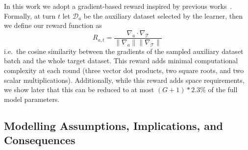 In this work we adopt a gradient-based reward inspired by previous works~\citep{https://doi.org/10.48550/arxiv.1812.02224, NEURIPS2019_0e900ad8, yu2020gradient, wang2021gradient}. Formally, at turn $t$ let $\mathcal{D}_a$ be the auxiliary dataset selected by the learner, then we define our reward function as
\begin{equation}
\label{eq:reward}
R_{a,t} = \frac{\nabla_{a}\cdot\nabla_{\mathcal{T}}}{\|\nabla_{a}\|\|\nabla_{\mathcal{T}}\|}
\end{equation}
i.e.\ the cosine similarity between the gradients of the sampled auxiliary dataset batch and the whole target dataset. This reward adds minimal computational complexity at each round (three vector dot products, two square roots, and two scalar multiplications). Additionally, while this reward adds space requirements,
we show later that this can be reduced to at most $(G+1)*2.3$\% of the full model parameters.



\subsection{Modelling Assumptions, Implications, and Consequences}
\label{sec:modelling_assumptions}

